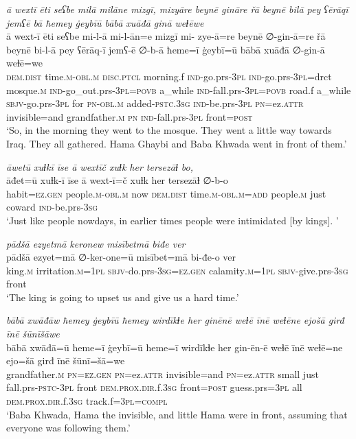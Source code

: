 \ea \label{BP.98}
\textit{ā wextī ēti seʕbe milā milāne mizgī, mizyāre beynē gināre řā beynē bilā pey ʕērāqī jemʕē bā ħemey ġeybīū bābā xuāđā ginā weɫēwe} \\ 
\gll ā wext-ī ēti seʕbe mi-l-ā mi-l-ān=e mizgī mi- zye-ā=re beynē ∅-gin-ā=re řā beynē bi-l-ā pey ʕērāq-ī jemʕ-ē ∅-b-ā ħeme=ī ġeybī=ū bābā xuāđā ∅-gin-ā weɫē=we \\ 
 \textsc{dem.dist} time\textsc{.m}\textsc{-obl}\textsc{.m} \textsc{disc.ptcl} morning.f \textsc{ind-}go.prs\textsc{-3pl} \textsc{ind-}go.prs\textsc{-3pl}=drct mosque\textsc{.m} \textsc{ind-}go\_out.prs\textsc{-3pl}\textsc{=\textsc{povb}} a\_while \textsc{ind-}fall.prs\textsc{-3pl}\textsc{=\textsc{povb}} road.f a\_while \textsc{sbjv-}go.prs\textsc{-3pl} for \textsc{pn}\textsc{-obl}\textsc{.m} added\textsc{-pstc}\textsc{.3sg} \textsc{ind-}be.prs\textsc{-3pl} \textsc{pn}=ez.\textsc{attr} invisible=and grandfather\textsc{.m} \textsc{pn} \textsc{ind-}fall.prs\textsc{-3pl} front\textsc{=\textsc{post}} \\ 
\glt `So, in the morning they went to the mosque. They went a little way towards Iraq. They all gathered. Hama Ghaybi and Baba Khwada went in front of them.'
\z 
 
\ea \label{BP.100}
\textit{āwetū xuɫkī īse ā wextīč xuɫk her tersezāɫ bo,} \\ 
\gll āđet=ū xuɫk-ī īse ā wext-ī=č xuɫk her tersezāɫ ∅-b-o \\ 
 habit\textsc{=ez.gen} people\textsc{.m}\textsc{-obl}\textsc{.m} now \textsc{dem.dist} time\textsc{.m}\textsc{-obl}\textsc{.m}\textsc{=add} people\textsc{.m} just coward \textsc{ind-}be.prs\textsc{-3sg} \\ 
\glt `Just like people nowdays, in earlier times people were intimidated [by kings]. '
\z 
 
\ea \label{BP.102}
\textit{pādšā ezyetmā keronew misībetmā biđe ver} \\ 
\gll pādšā ezyet=mā ∅-ker-one=ū misībet=mā bi-đe-o ver \\ 
 king\textsc{.m} irritation\textsc{.m}\textsc{=\textsc{1pl}} \textsc{sbjv-}do.prs\textsc{-3sg}\textsc{=ez.gen} calamity\textsc{.m}\textsc{=\textsc{1pl}} \textsc{sbjv-}give.prs\textsc{-3sg} front \\ 
\glt `The king is going to upset us and give us a hard time.'
\z 
 
\ea \label{BP.105}
\textit{bābā xwāđāw ħemey ġeybīū ħemey wirdīkɫe her ginēnē weɫē īnē weɫēne ejošā girđ īnē šūnīšāwe} \\ 
\gll bābā xwāđā=ū ħeme=ī ġeybī=ū ħeme=ī wirdīkɫe her gin-ēn-ē weɫē īnē weɫē=ne ejo=šā girđ īnē šūnī=šā=we \\ 
 grandfather\textsc{.m} \textsc{pn}\textsc{=ez.gen} \textsc{pn}=ez.\textsc{attr} invisible=and \textsc{pn}=ez.\textsc{attr} small just fall.prs\textsc{-pstc}\textsc{-3pl} front \textsc{dem.prox}\textsc{.dir}.f\textsc{.3sg} front\textsc{=\textsc{post}} guess.prs\textsc{=3pl} all \textsc{dem.prox}\textsc{.dir}.f\textsc{.3sg} track.f\textsc{=3pl}\textsc{=compl} \\ 
\glt `Baba Khwada, Hama the invisible, and little Hama were in front, assuming that everyone was following them.'
\z 
 
